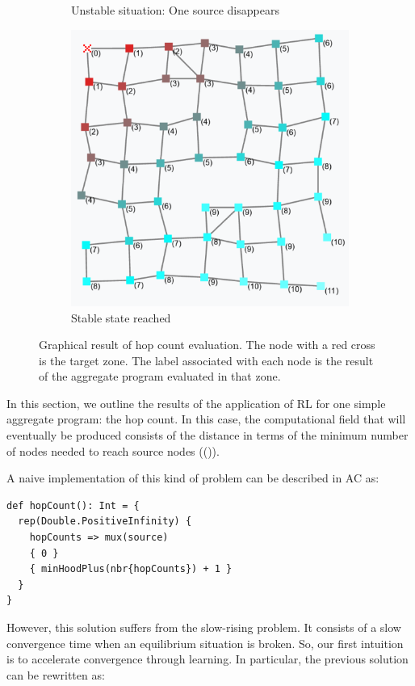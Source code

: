 \documentclass[conference]{IEEEtran}
\begin{document}
\begin{figure}[h]
\begin{subfigure}[b]{0.32\textwidth}
      \caption{Unstable situation: One source disappears}
  \end{subfigure}
  \hfill
  \begin{subfigure}[b]{0.32\textwidth}
      \centering
      \includegraphics[width=\textwidth]{img/hop-count-3.png}
      \caption{Stable state reached}
  \end{subfigure}
  \caption{Graphical result of hop count evaluation. The node with a red cross is the target zone. The label 
  associated with each node is the result of the aggregate program evaluated in that zone.}
  \label{fig:hop-count}
\end{figure}
In this section, we outline the results of the application of RL for one simple
 aggregate program: the hop count. In this case, the computational field that will eventually be produced consists of the distance in terms of the minimum number of nodes needed to reach source nodes (()).

A naive implementation of this kind of problem can be described in AC as:
\begin{verbatim}
def hopCount(): Int = {
  rep(Double.PositiveInfinity) { 
    hopCounts => mux(source) 
    { 0 } 
    { minHoodPlus(nbr{hopCounts}) + 1 }
  }
}
\end{verbatim}
However, this solution suffers from the slow-rising problem. 
 It consists of a slow convergence time when an equilibrium situation is broken.
So, our first intuition is to accelerate convergence through learning.
 In particular, the previous solution can be rewritten as:
\end{document}

